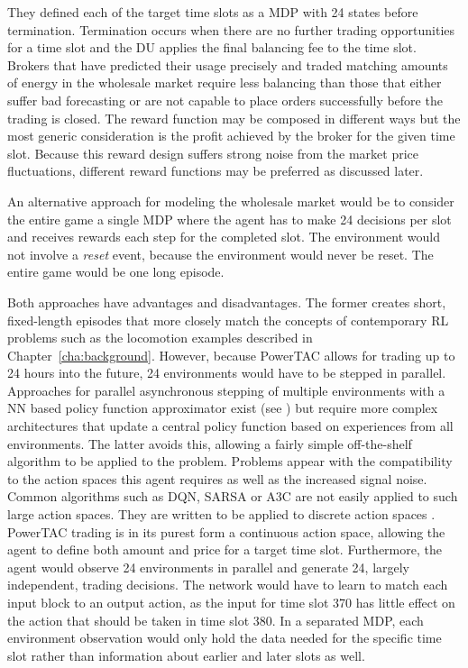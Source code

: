 They defined each of the target time slots as a \ac{MDP} with 24 states before termination. Termination occurs when
there are no further trading opportunities for a time slot and the \ac{DU} applies the final balancing fee to the
time slot. Brokers that have predicted their usage precisely and traded matching amounts of energy in the wholesale
market require less balancing than those that either suffer bad forecasting or are not capable to place orders
successfully before the trading is closed. The reward function may be composed in different ways but the most generic
consideration is the profit achieved by the broker for the given time slot. Because this reward design suffers strong
noise from the market price fluctuations, different reward functions may be preferred as discussed later.

An alternative approach for modeling the wholesale market would be to consider the entire game a single \ac{MDP} where
the agent has to make 24 decisions per slot and receives rewards each step for the completed slot. The environment would
not involve a \emph{reset} event, because the environment would never be reset. The entire game would be one long
episode.

Both approaches have advantages and disadvantages. The former creates short, fixed-length episodes that more closely
match the concepts of contemporary \ac{RL} problems such as the locomotion examples described in
Chapter~\ref{cha:background}. However, because \ac{PowerTAC} allows for trading up to 24 hours into the future, 24
environments would have to be stepped in parallel. Approaches for parallel asynchronous stepping of multiple
environments with a \ac{NN} based policy function approximator exist (see \citet{mnih2016asynchronous,hafner2017agents})
but require more complex architectures that update a central policy function based on experiences from all environments.
The latter avoids this, allowing a fairly simple off-the-shelf algorithm to be applied to the problem. Problems appear
with the compatibility to the action spaces this agent requires as well as the increased signal noise. Common algorithms
such as \ac{DQN}, \ac{SARSA} or \ac{A3C} are not easily applied to such large action spaces. They
are written to be applied to discrete action spaces
\cite[]{baselines}. \ac{PowerTAC} trading is in its purest form a
continuous action space, allowing the agent to define both amount and price for a target time slot. Furthermore, the
agent would observe 24 environments in parallel and generate 24, largely independent, trading decisions. The network would have to learn
to match each input block to an output action, as the input for time slot 370 has little effect on the action that
should be taken in time slot 380. In a separated \ac{MDP}, each environment observation would only hold the data needed
for the specific time slot rather than information about earlier and later slots as well.


